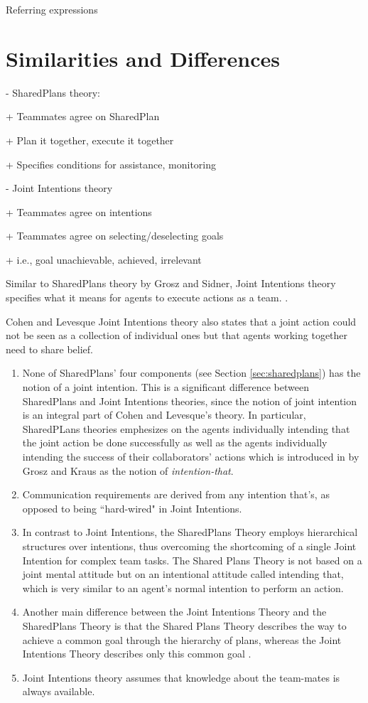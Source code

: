 \documentclass[11pt]{article}
\begin{document}
Referring expressions \cite{heeman:model-collaboration-referring}

\section{Similarities and Differences}

- SharedPlans theory:

+ Teammates agree on SharedPlan

+ Plan it together, execute it together

+ Specifies conditions for assistance, monitoring

- Joint Intentions theory

+ Teammates agree on intentions

+ Teammates agree on selecting/deselecting goals

+ i.e., goal unachievable, achieved, irrelevant

Similar to SharedPlans theory by Grosz and Sidner, Joint Intentions theory
specifies what it means for agents to execute actions as a team.
\cite{subramanian:joint-intention-dialogue}.

Cohen and Levesque Joint Intentions theory also states that a joint action could
not be seen as a collection of individual ones but that agents working together
need to share belief.

\begin{enumerate}
  \item None of SharedPlans' four components (see Section \ref{sec:sharedplans})
  has the notion of a joint intention. This is a significant difference between
  SharedPlans and Joint Intentions theories, since the notion of joint intention
  is an integral part of Cohen and Levesque's theory. In particular, SharedPLans
  theories emphesizes on the agents individually intending that the joint action
  be done successfully as well as the agents individually intending the success
  of their collaborators' actions which is introduced in
  \cite{grosz:collaboration} by Grosz and Kraus as the notion of
  \textit{intention-that}.
  \item Communication requirements are derived from any intention that's, as
  opposed to being ``hard-wired" in Joint Intentions.
  \item In contrast to Joint Intentions, the SharedPlans Theory employs
  hierarchical structures over intentions, thus overcoming the shortcoming of a
  single Joint Intention for complex team tasks. The Shared Plans Theory is not
  based on a joint mental attitude but on an intentional attitude called
  intending that, which is very similar to an agent’s normal intention to
  perform an action.
  \item Another main difference between the Joint Intentions Theory and the
  SharedPlans Theory is that the Shared Plans Theory describes the way to
  achieve a common goal through the hierarchy of plans, whereas the Joint
  Intentions Theory describes only this common goal
  \cite{skubch:modelling-behavior-robots}.
  \item Joint Intentions theory assumes that knowledge about the team-mates is
  always available.
\end{enumerate}
\end{document}
